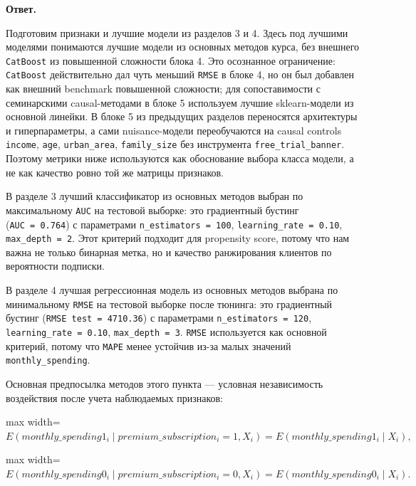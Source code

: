 \documentclass[11pt]{article}
\begin{document}
\textbf{Ответ.}

Подготовим признаки и лучшие модели из разделов 3 и 4. Здесь под лучшими
моделями понимаются лучшие модели из основных методов курса, без
внешнего \texttt{CatBoost} из повышенной сложности блока 4. Это
осознанное ограничение: \texttt{CatBoost} действительно дал чуть меньший
\texttt{RMSE} в блоке 4, но он был добавлен как внешний benchmark
повышенной сложности; для сопоставимости с семинарскими causal-методами
в блоке 5 используем лучшие sklearn-модели из основной линейки. В блоке
5 из предыдущих разделов переносятся архитектуры и гиперпараметры, а
сами nuisance-модели переобучаются на causal controls \texttt{income},
\texttt{age}, \texttt{urban\_area}, \texttt{family\_size} без
инструмента \texttt{free\_trial\_banner}. Поэтому метрики ниже
используются как обоснование выбора класса модели, а не как качество
ровно той же матрицы признаков.

В разделе 3 лучший классификатор из основных методов выбран по
максимальному \texttt{AUC} на тестовой выборке: это градиентный бустинг
(\texttt{AUC\ =\ 0.764}) с параметрами \texttt{n\_estimators\ =\ 100},
\texttt{learning\_rate\ =\ 0.10}, \texttt{max\_depth\ =\ 2}. Этот
критерий подходит для propensity score, потому что нам важна не только
бинарная метка, но и качество ранжирования клиентов по вероятности
подписки.

В разделе 4 лучшая регрессионная модель из основных методов выбрана по
минимальному \texttt{RMSE} на тестовой выборке после тюнинга: это
градиентный бустинг (\texttt{RMSE\ test\ =\ 4710.36}) с параметрами
\texttt{n\_estimators\ =\ 120}, \texttt{learning\_rate\ =\ 0.10},
\texttt{max\_depth\ =\ 3}. \texttt{RMSE} используется как основной
критерий, потому что \texttt{MAPE} менее устойчив из-за малых значений
\texttt{monthly\_spending}.

Основная предпосылка методов этого пункта --- условная независимость
воздействия после учета наблюдаемых признаков:

\begin{center}
\begin{adjustbox}{max width=\linewidth}
\(\displaystyle E(monthly\_spending1_i \mid premium\_subscription_i = 1, X_i) = E(monthly\_spending1_i \mid X_i),\)
\end{adjustbox}
\end{center}
\begin{center}
\begin{adjustbox}{max width=\linewidth}
\(\displaystyle E(monthly\_spending0_i \mid premium\_subscription_i = 0, X_i) = E(monthly\_spending0_i \mid X_i).\)
\end{adjustbox}
\end{center}
\end{document}
